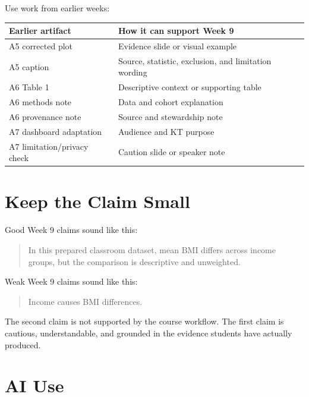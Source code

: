 \documentclass[
  letterpaper,
  DIV=11,
  numbers=noendperiod,
  oneside]{scrreprt}
\begin{document}

Use work from earlier weeks:

\begin{longtable}[]{@{}ll@{}}
\toprule\noalign{}
Earlier artifact & How it can support Week 9 \\
\midrule\noalign{}
\endhead
\bottomrule\noalign{}
\endlastfoot
A5 corrected plot & Evidence slide or visual example \\
A5 caption & Source, statistic, exclusion, and limitation wording \\
A6 Table 1 & Descriptive context or supporting table \\
A6 methods note & Data and cohort explanation \\
A6 provenance note & Source and stewardship note \\
A7 dashboard adaptation & Audience and KT purpose \\
A7 limitation/privacy check & Caution slide or speaker note \\
\end{longtable}

\section*{Keep the Claim Small}\label{keep-the-claim-small}


Good Week 9 claims sound like this:

\begin{quote}
In this prepared classroom dataset, mean BMI differs across income
groups, but the comparison is descriptive and unweighted.
\end{quote}

Weak Week 9 claims sound like this:

\begin{quote}
Income causes BMI differences.
\end{quote}

The second claim is not supported by the course workflow. The first
claim is cautious, understandable, and grounded in the evidence students
have actually produced.

\section*{AI Use}\label{ai-use}
\end{document}
